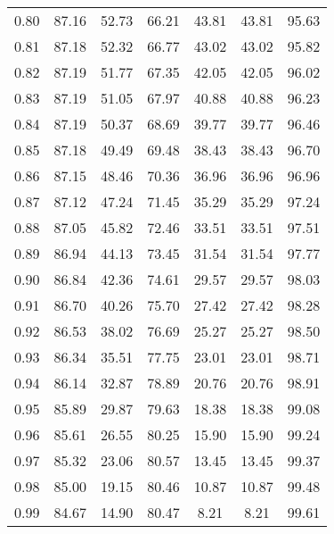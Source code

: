 \begin{tabular}{|c|c|c|c|c|c|c|}
      0.80 &     87.16 &     52.73 &      66.21 &   43.81 &      43.81 &         95.63 \\
      0.81 &     87.18 &     52.32 &      66.77 &   43.02 &      43.02 &         95.82 \\
      0.82 &     87.19 &     51.77 &      67.35 &   42.05 &      42.05 &         96.02 \\
      0.83 &     87.19 &     51.05 &      67.97 &   40.88 &      40.88 &         96.23 \\
      0.84 &     87.19 &     50.37 &      68.69 &   39.77 &      39.77 &         96.46 \\
      0.85 &     87.18 &     49.49 &      69.48 &   38.43 &      38.43 &         96.70 \\
      0.86 &     87.15 &     48.46 &      70.36 &   36.96 &      36.96 &         96.96 \\
      0.87 &     87.12 &     47.24 &      71.45 &   35.29 &      35.29 &         97.24 \\
      0.88 &     87.05 &     45.82 &      72.46 &   33.51 &      33.51 &         97.51 \\
      0.89 &     86.94 &     44.13 &      73.45 &   31.54 &      31.54 &         97.77 \\
      0.90 &     86.84 &     42.36 &      74.61 &   29.57 &      29.57 &         98.03 \\
      0.91 &     86.70 &     40.26 &      75.70 &   27.42 &      27.42 &         98.28 \\
      0.92 &     86.53 &     38.02 &      76.69 &   25.27 &      25.27 &         98.50 \\
      0.93 &     86.34 &     35.51 &      77.75 &   23.01 &      23.01 &         98.71 \\
      0.94 &     86.14 &     32.87 &      78.89 &   20.76 &      20.76 &         98.91 \\
      0.95 &     85.89 &     29.87 &      79.63 &   18.38 &      18.38 &         99.08 \\
      0.96 &     85.61 &     26.55 &      80.25 &   15.90 &      15.90 &         99.24 \\
      0.97 &     85.32 &     23.06 &      80.57 &   13.45 &      13.45 &         99.37 \\
      0.98 &     85.00 &     19.15 &      80.46 &   10.87 &      10.87 &         99.48 \\
      0.99 &     84.67 &     14.90 &      80.47 &    8.21 &       8.21 &         99.61 \\
\bottomrule
\end{tabular}
